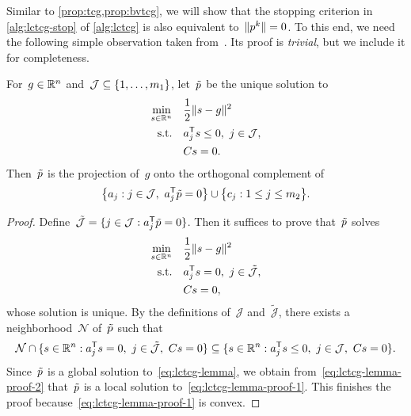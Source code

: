 Similar to \cref{prop:tcg,prop:bvtcg}, we will show that the stopping criterion
in \cref{alg:lctcg-stop} of \cref{alg:lctcg} is also equivalent to~$\norm{\pstep[k]} = 0$.
To this end, we need the following simple observation taken from~\cite[\S~3]{Powell_2015}.
Its proof is \emph{trivial}, but we include it for completeness.

\begin{lemma}
    \label{lem:lctcg}
    For~$g \in \mathbb{R}^n$ and~$\mathcal{J} \subseteq \{1, \dots, m_1\}$, let~$\tilde{\pstep}$ be the unique solution to
    \begin{subequations}
        \label{eq:lctcg-lemma}
        \begin{align}
            \min_{\sstep \in \R^n}  & \quad \frac{1}{2} \norm{\sstep - g}^2\\
            \text{s.t.}             & \quad a_j^{\T} \sstep \le 0, ~ j \in \mathcal{J},\\
                                    & \quad C \sstep = 0.
        \end{align}
    \end{subequations}
    Then~$\tilde{\pstep}$ is the projection of~$g$ onto the orthogonal complement of
    \begin{equation*}
        \set[\big]{a_j : j \in \mathcal{J}, ~ a_j^{\T} \tilde{\pstep} = 0} \cup \set[\big]{c_j : 1 \le j \le m_2}.
    \end{equation*}
\end{lemma}

\begin{proof}
    Define~$\tilde{\mathcal{J}} = \set{j \in \mathcal{J} : a_j^{\T} \tilde{\pstep} = 0}$.
    Then it suffices to prove that~$\tilde{\pstep}$ solves
    \begin{subequations}
        \label{eq:lctcg-lemma-proof-1}
        \begin{align}
            \min_{\sstep \in \R^n}  & \quad \frac{1}{2} \norm{\sstep - g}^2\\
            \text{s.t.}             & \quad a_j^{\T} \sstep = 0, ~ j \in \tilde{\mathcal{J}},\\
                                    & \quad C \sstep = 0,
        \end{align}
    \end{subequations}
    whose solution is unique.
    By the definitions of~$\mathcal{J}$ and~$\tilde{\mathcal{J}}$, there exists a neighborhood~$\mathcal{N}$ of~$\tilde{\pstep}$ such that
    \begin{equation}
        \label{eq:lctcg-lemma-proof-2}
        \mathcal{N} \cap \set{\sstep \in \R^n : a_j^{\T} \sstep = 0, ~ j \in \tilde{\mathcal{J}}, ~ C \sstep = 0} \subseteq \set{\sstep \in \R^n : a_j^{\T} \sstep \le 0, ~ j \in \mathcal{J}, ~ C \sstep = 0}.
    \end{equation}
    Since~$\tilde{\pstep}$ is a global solution to~\cref{eq:lctcg-lemma}, we obtain from~\cref{eq:lctcg-lemma-proof-2} that~$\tilde{\pstep}$ is a local solution to~\cref{eq:lctcg-lemma-proof-1}.
    This finishes the proof because~\cref{eq:lctcg-lemma-proof-1} is convex.
\end{proof}

